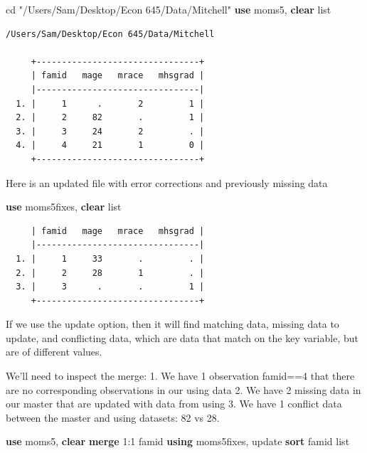 \documentclass[
]{book}
\newenvironment{Shaded}{\begin{snugshade}}{\end{snugshade}}
\newcommand{\KeywordTok}[1]{\textcolor[rgb]{0.13,0.29,0.53}{\textbf{#1}}}
\newcommand{\NormalTok}[1]{#1}
\newcommand{\OtherTok}[1]{\textcolor[rgb]{0.56,0.35,0.01}{#1}}
\newcommand{\StringTok}[1]{\textcolor[rgb]{0.31,0.60,0.02}{#1}}
\begin{document}
\begin{Shaded}
\begin{Highlighting}[]
\NormalTok{cd }\StringTok{"/Users/Sam/Desktop/Econ 645/Data/Mitchell"}
\KeywordTok{use}\NormalTok{ moms5, }\KeywordTok{clear}
\OtherTok{list}
\end{Highlighting}
\end{Shaded}

\begin{verbatim}
/Users/Sam/Desktop/Econ 645/Data/Mitchell

     +--------------------------------+
     | famid   mage   mrace   mhsgrad |
     |--------------------------------|
  1. |     1      .       2         1 |
  2. |     2     82       .         1 |
  3. |     3     24       2         . |
  4. |     4     21       1         0 |
     +--------------------------------+
\end{verbatim}

Here is an updated file with error corrections and previously missing data

\begin{Shaded}
\begin{Highlighting}[]
\KeywordTok{use}\NormalTok{ moms5fixes, }\KeywordTok{clear}
\OtherTok{list}
\end{Highlighting}
\end{Shaded}

\begin{verbatim}
     | famid   mage   mrace   mhsgrad |
     |--------------------------------|
  1. |     1     33       .         . |
  2. |     2     28       1         . |
  3. |     3      .       .         1 |
     +--------------------------------+
\end{verbatim}

If we use the update option, then it will find matching data, missing data to update, and conflicting data, which are data that match on the key variable, but are of different values.

We'll need to inspect the merge:
1. We have 1 observation famid==4 that there are no corresponding observations in our using data
2. We have 2 missing data in our master that are updated with data from using
3. We have 1 conflict data between the master and using datasets: 82 vs 28.

\begin{Shaded}
\begin{Highlighting}[]
\KeywordTok{use}\NormalTok{ moms5, }\KeywordTok{clear}
\KeywordTok{merge}\NormalTok{ 1:1 famid }\KeywordTok{using}\NormalTok{ moms5fixes, update }
\KeywordTok{sort}\NormalTok{ famid}
\OtherTok{list}
\end{Highlighting}
\end{Shaded}
\end{document}
